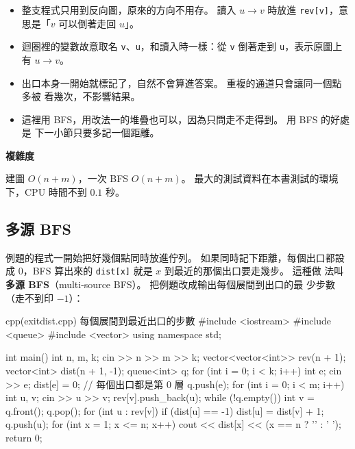 \begin{itemize}
\item 整支程式只用到反向圖，原來的方向不用存。 讀入 $u \to v$ 時放進
\texttt{rev[v]}，意思是「$v$ 可以倒著走回 $u$」。
\item 迴圈裡的變數故意取名 \texttt{v}、\texttt{u}，和讀入時一樣：從 \texttt{v}
倒著走到 \texttt{u}，表示原圖上有 $u \to v$。
\item 出口本身一開始就標記了，自然不會算進答案。 重複的通道只會讓同一個點多被
看幾次，不影響結果。
\item 這裡用 BFS，用改法一的堆疊也可以，因為只問走不走得到。 用 BFS 的好處是
下一小節只要多記一個距離。
\end{itemize}

\textbf{複雜度}

建圖 $O(n + m)$，一次 BFS $O(n + m)$。 最大的測試資料在本書測試的環境下，CPU
時間不到 $0.1$ 秒。

\subsection{多源 BFS}
\label{sec:multi-source}

例題的程式一開始把好幾個點同時放進佇列。 如果同時記下距離，每個出口都設成
$0$，BFS 算出來的 \texttt{dist[x]} 就是 $x$ 到最近的那個出口要走幾步。 這種做
法叫\textbf{多源 BFS}（multi-source BFS）。 把例題改成輸出每個展間到出口的最
少步數（走不到印 $-1$）：

\begin{example}[label=ex:exitdist]{cpp}{(exitdist.cpp) 每個展間到最近出口的步數}
#include <iostream>
#include <queue>
#include <vector>
using namespace std;

int main() {
    int n, m, k;
    cin >> n >> m >> k;
    vector<vector<int>> rev(n + 1);
    vector<int> dist(n + 1, -1);
    queue<int> q;
    for (int i = 0; i < k; i++) {
        int e;
        cin >> e;
        dist[e] = 0;                         // 每個出口都是第 0 層
        q.push(e);
    }
    for (int i = 0; i < m; i++) {
        int u, v;
        cin >> u >> v;
        rev[v].push_back(u);
    }
    while (!q.empty()) {
        int v = q.front();
        q.pop();
        for (int u : rev[v]) {
            if (dist[u] == -1) {
                dist[u] = dist[v] + 1;
                q.push(u);
            }
        }
    }
    for (int x = 1; x <= n; x++) {
        cout << dist[x] << (x == n ? '\n' : ' ');
    }
    return 0;
}
\end{example}


